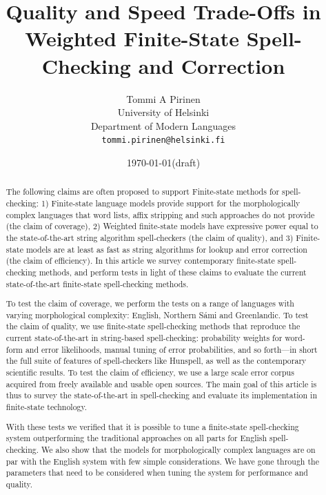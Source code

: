 \documentclass[a4paper,12pt]{article}
\title{Quality and Speed Trade-Offs in
    Weighted Finite-State Spell-Checking and Correction}
\author{Tommi A Pirinen\\
 [0.5cm] University of Helsinki\\ %
 Department of Modern Languages\\ %
 \texttt{tommi.pirinen@helsinki.fi}}   %
\date{\today (draft)}
\begin{document}
\maketitle
\thispagestyle{empty}

\begin{abstract} \noindent The following claims are often proposed to support
    Finite-state methods for spell-checking: 1) Finite-state language models
    provide support for the morphologically complex languages that word lists,
    affix stripping and such approaches do not provide (the claim of coverage),
    2) Weighted finite-state models have expressive power equal to the
    state-of-the-art string algorithm spell-checkers (the claim of quality),
    and 3) Finite-state models are at least as fast as string algorithms for
    lookup and error correction (the claim of efficiency).  In this article we
    survey contemporary finite-state spell-checking methods, and perform tests
    in light of these claims to evaluate the current state-of-the-art
    finite-state spell-checking methods.

    To test the claim of coverage, we perform the tests on a range of
    languages with varying morphological complexity: English,
    Northern Sámi and Greenlandic.  To test the claim of quality, we use
    finite-state spell-checking methods that reproduce the current
    state-of-the-art in string-based spell-checking: probability weights for
    word-form and error likelihoods, manual tuning of error probabilities, and
    so forth---in short the full suite of features of spell-checkers like
    Hunspell, as well as the contemporary scientific results. To test the claim
    of efficiency, we use a large scale error corpus acquired from freely
    available and usable open sources. The main goal of this article is thus to
    survey the state-of-the-art in spell-checking and evaluate its
    implementation in finite-state technology.  

    With these tests we verified that it is possible to tune a finite-state
    spell-checking system outperforming the traditional approaches on all parts
    for English spell-checking. We also show that the models for
    morphologically complex languages are on par with the English system with
    few simple considerations. We have gone through the parameters that need to
    be considered when tuning the system for performance and quality.

\end{abstract}
\end{document}
